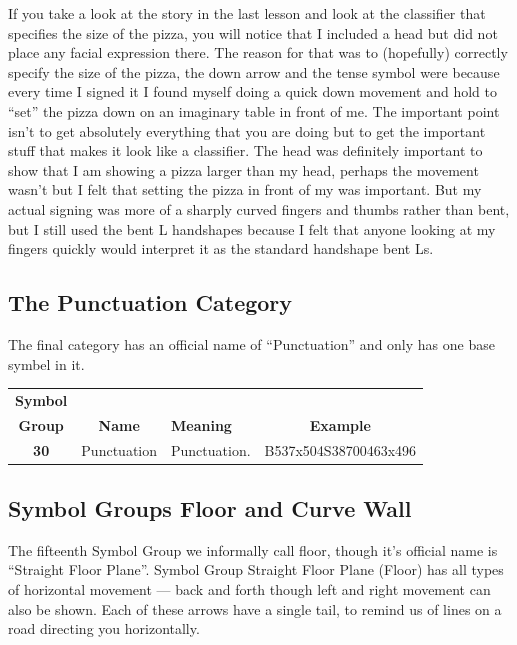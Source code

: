 \documentclass{article}
\begin{document}
If you take a look at the story in the last lesson and look at the classifier that specifies the size of the pizza, you will notice that I included a head but did not place any facial expression there.
The reason for that was to (hopefully) correctly specify the size of the pizza, the down arrow and the tense symbol were because every time I signed it I found myself doing a quick down movement and hold to ``set'' the pizza down on an imaginary table in front of me.
The important point isn't to get absolutely everything that you are doing but to get the important stuff that makes it look like a classifier.
The head was definitely important to show that I am showing a pizza larger than my head, perhaps the movement wasn't but I felt that setting the pizza in front of my was important.
But my actual signing was more of a sharply curved fingers and thumbs rather than bent, but I still used the bent L handshapes because I felt that anyone looking at my fingers quickly would interpret it as the standard handshape bent Ls.

\subsection{The Punctuation Category}

The final category has an official name of ``Punctuation'' and only has one base symbel in it.

\begin{center}
\begin{tabular}{ccp{21mm}c}
\textbf{Symbol}\\
\textbf{Group}&\textbf{Name}&\textbf{Meaning}&\textbf{Example}\\
\textbf{30}&Punctuation&Punctuation.&B537x504S38700463x496\\
\end{tabular}
\end{center}

\subsection{Symbol Groups Floor and Curve Wall}

The fifteenth Symbol Group we informally call floor, though it's official name is ``Straight Floor Plane''.
Symbol Group Straight Floor Plane (Floor) has all types of horizontal movement --- back and forth though left and right movement can also be shown.
Each of these arrows have a single tail, to remind us of lines on a road directing you horizontally.
\end{document}

